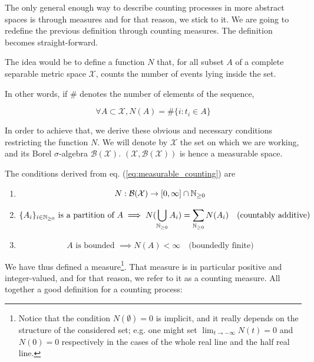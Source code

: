 The only general enough way to describe counting processes in more abstract spaces is through measures and for that reason, we stick to it. We are going to redefine the previous definition through counting measures. The definition becomes straight-forward.

The idea would be to define a function $N$ that, for all subset $A$ of a complete separable metric space $\mathcal X$, counts the number of events lying inside the set.

In other words, if $\#$ denotes the number of elements of the sequence,

\begin{equation}
\forall A \subset \mathcal X, N(A) = \# \{ i: t_i \in A \}
\label{eq:measurable_counting}
\end{equation}

In order to achieve that, we derive these obvious and necessary conditions restricting the function $N$. We will denote by $\mathcal X$ the set on which we are working, and its Borel $\sigma$-algebra $\mathcal B( \mathcal X )$. $( \mathcal X, \mathcal B( \mathcal X ) )$ is hence a measurable space.

The conditions derived from eq. (\ref{eq:measurable_counting}) are
\begin{enumerate}
\setlength{\itemindent}{1 cm}
\item  
\begin{equation}
N : \mathcal B( \mathcal X ) \to [0, \infty ] \cap \mathbb{N}_{\geq 0}
\end{equation}
\item 
\begin{equation}
\{ A_i \}_{ i \in \mathbb{N}_{\geq 0}} \text{ is a partition of } A \implies N( \bigcup_{\mathbb{N}_{\geq 0}} A_i ) = \sum_{\mathbb{N}_{\geq 0}} N(A_i)  \quad \text{(countably additive)}
\end{equation}
\item 
\begin{equation}
A \text{ is bounded } \implies N(A) < \infty  \quad \text{(boundedly finite)}
\end{equation}
\end{enumerate}

We have thus defined a measure\footnote{Notice that the condition $N( \emptyset ) = 0$ is implicit, and it really depends on the structure of the considered set; e.g. one might set $\lim_{t\to -\infty} N(t) = 0$ and $N(0) = 0$ respectively in the cases of the whole real line and the half real line.}. That measure is in particular positive and integer-valued, and for that reason, we refer to it as a counting measure. All together a good definition for a counting process:

